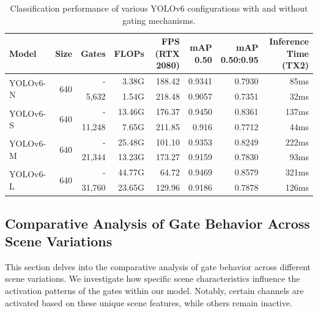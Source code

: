 \documentclass[runningheads]{llncs}
\begin{document}
\begin{table}[ht]
    \centering
    \begin{tabular}{lrrrrrrr}
    \hline
    \textbf{Model} & \textbf{Size} & \textbf{Gates} & \textbf{FLOPs} & \makecell{\textbf{FPS} \\ \textbf{(RTX 2080)}} & \makecell{\textbf{mAP} \\ \textbf{0.50}} & \makecell{\textbf{mAP} \\ \textbf{0.50:0.95}} & \makecell{\textbf{Inference Time} \\ \textbf{(TX2)}} \\
    \hline
    \multirow{2}{*}{YOLOv6-N} & \multirow{2}{*}{640} & - & 3.38G & 188.42 & 0.9341 & 0.7930 & 85ms \\
     & & 5,632 & 1.54G & 218.48 & 0.9057 & 0.7351 & 32ms \\
    \hline
    \multirow{2}{*}{YOLOv6-S} & \multirow{2}{*}{640} & - & 13.46G & 176.37 & 0.9450 & 0.8361 & 137ms \\
     & & 11,248 & 7.65G & 211.85 & 0.916 & 0.7712 & 44ms \\
    \hline
    \multirow{2}{*}{YOLOv6-M} & \multirow{2}{*}{640} & - & 25.48G & 101.10 & 0.9353 & 0.8249 & 222ms \\
     & & 21,344 & 13.23G & 173.27 & 0.9159 & 0.7830 & 93ms \\
    \hline
    \multirow{2}{*}{YOLOv6-L} & \multirow{2}{*}{640} & - & 44.77G & 64.72 & 0.9469 & 0.8579 & 321ms \\
     & & 31,760 & 23.65G & 129.96 & 0.9186 & 0.7878 & 126ms \\
    \hline
    \end{tabular}
    \caption{Classification performance of various YOLOv6 configurations with and without gating mechanisms.}
    \label{table:classification_performance}
    \end{table}
    

\subsection{Comparative Analysis of Gate Behavior Across Scene Variations}

This section delves into the comparative analysis of gate behavior across different scene variations. We investigate how specific scene characteristics influence the activation patterns of the gates within our model. Notably, certain channels are activated based on these unique scene features, while others remain inactive.
\end{document}
